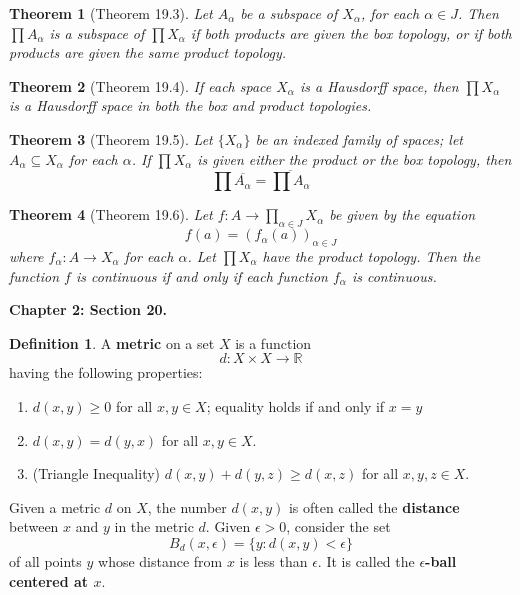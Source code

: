 \documentclass{article}
\newtheorem{theorem}{Theorem}
\theoremstyle{definition}
\newtheorem{definition}{Definition}[section]
\theoremstyle{remark}
\begin{document}
    \begin{theorem}[Theorem 19.3]
        Let $A_{\alpha}$ be a subspace of $X_{\alpha}$, for each $\alpha\in J$. Then $\prod A_{\alpha}$ is a subspace of
        $\prod X_{\alpha}$ if both products are given the box topology, or if both products are given the same product topology.
    \end{theorem}

    \begin{theorem}[Theorem 19.4]
        If each space $X_{\alpha}$ is a Hausdorff space, then $\prod X_{\alpha}$ is a Hausdorff space in both the box and product
        topologies.
    \end{theorem}

    \begin{theorem}[Theorem 19.5]
        Let $\{X_{\alpha}\}$ be an indexed family of spaces; let $A_{\alpha}\subseteq X_{\alpha}$ for each $\alpha$. If
        $\prod X_{\alpha}$ is given either the product or the box topology, then
        \[ \prod \overline{A_{\alpha}} = \overline{\prod A_{\alpha}} \]
    \end{theorem}

    \begin{theorem}[Theorem 19.6]
        Let $f: A \to \prod_{\alpha\in J} X_{\alpha}$ be given by the equation
        \[ f(a) = (f_{\alpha}(a))_{\alpha\in J} \]
        where $f_{\alpha}: A \to X_{\alpha}$ for each $\alpha$. Let $\prod X_{\alpha}$ have the product topology. Then the function
        $f$ is continuous if and only if each function $f_{\alpha}$ is continuous.
    \end{theorem}

    \newpage

    \textbf{Chapter 2: Section 20.}
    \begin{definition}
        A \textbf{metric} on a set $X$ is a function
        \[ d: X \times X \to \mathbb{R} \]
        having the following properties:
        \begin{enumerate}
            \item $d(x,y)\geq 0$ for all $x,y\in X$; equality holds if and only if $x=y$
            \item $d(x,y) = d(y,x)$ for all $x,y\in X$.
            \item (Triangle Inequality) $d(x,y) + d(y,z) \geq d(x,z)$ for all $x,y,z\in X$.
        \end{enumerate}
    \end{definition}

    Given a metric $d$ on $X$, the number $d(x,y)$ is often called the \textbf{distance} between $x$ and $y$ in the metric $d$. Given
    $\epsilon>0$, consider the set
    \[ B_d(x,\epsilon) = \{y: d(x,y) < \epsilon\} \]
    of all points $y$ whose distance from $x$ is less than $\epsilon$. It is called the \textbf{$\epsilon$-ball centered at $x$}.
    
\end{document}
